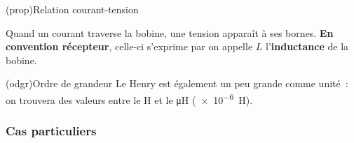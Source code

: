 \documentclass[../../main/main.tex]{subfiles}
\begin{document}
\begin{tcb}[label=prop:Lcarac, sidebyside, righthand ratio=.3](prop){Relation courant-tension}
	\begin{isd}[righthand ratio=.3, sidebyside align=top]
		Quand un courant traverse la bobine, une tension apparaît à ses bornes.
		\textbf{En convention récepteur}, celle-ci s'exprime par
		\psw{
			\[\boxed{u_L = L\dv{i}{t}}\]
		}
		\tcblower
		on appelle $L$ l'\textbf{inductance} de la bobine.
	\end{isd}
	\tcblower
	\begin{center}
	\end{center}
\end{tcb}

\begin{tcb}(odgr){Ordre de grandeur}
	Le Henry est également un peu grande comme unité~: on trouvera des valeurs
	entre le \si{H} et le \si{\micro H} (\SI{e-6}{H}).
\end{tcb}

\subsubsection{Cas particuliers}
\end{document}
